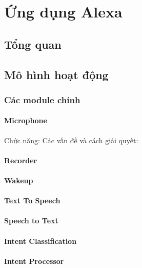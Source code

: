 \chapter{Ứng dụng Alexa}
\ifpdf
    \graphicspath{{Chapter5/Chapter5Figs/PNG/}{Chapter5/Chapter5Figs/PDF/}{Chapter5/Chapter5Figs/}}
\else
    \graphicspath{{Chapter5/Chapter5Figs/EPS/}{Chapter5/Chapter5Figs/}}
\fi

\section{Tổng quan}

\section{Mô hình hoạt động}

\subsection{Các module chính}

\subsubsection{Microphone}
Chức năng:
Các vấn đề và cách giải quyết:

\subsubsection{Recorder}

\subsubsection{Wakeup}

\subsubsection{Text To Speech}

\subsubsection{Speech to Text}

\subsubsection{Intent Classification}

\subsubsection{Intent Processor}

